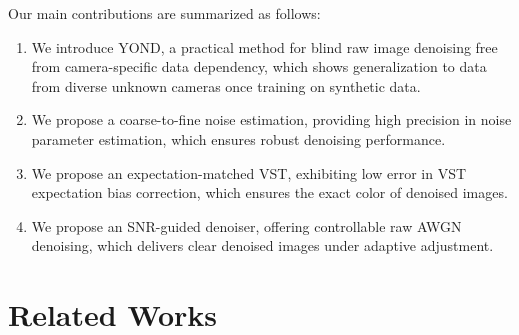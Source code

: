 \documentclass[lettersize,journal]{IEEEtran}
\begin{document}
	Our main contributions are summarized as follows:
	
	\begin{enumerate} [leftmargin=0.82cm]
		\item[1.] We introduce YOND, a practical method for blind raw image denoising free from camera-specific data dependency, which shows generalization to data from diverse unknown cameras once training on synthetic data.
		
		\item[2.] We propose a coarse-to-fine noise estimation, providing high precision in noise parameter estimation, which ensures robust denoising performance.
		
		\item[3.] We propose an expectation-matched VST, exhibiting low error in VST expectation bias correction, which ensures the exact color of denoised images.
		
		\item[4.] We propose an SNR-guided denoiser, offering controllable raw AWGN denoising, which delivers clear denoised images under adaptive adjustment.
		
	\end{enumerate}
	
	\section{Related Works}
\end{document}
